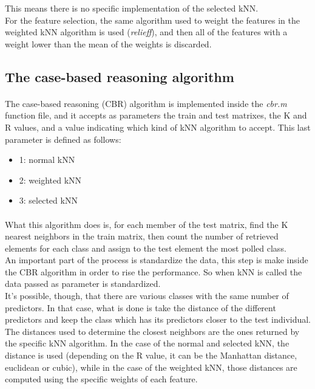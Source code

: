 \documentclass[12pt, a4paper]{article}
\begin{document}
This means there is no specific implementation of the selected kNN.\\

For the feature selection, the same algorithm used to weight the features in the weighted kNN algorithm is used (\emph{relieff}), and then all of the features with a weight lower than the mean of the weights is discarded.
\subsection{The case-based reasoning algorithm} %
\label{sub:the_case_based_reasoning_algorithm}
\paragraph{}The case-based reasoning (CBR) algorithm is implemented inside the \emph{cbr.m} function file, and it accepts as parameters the train and test matrixes, the K and R values, and a value indicating which kind of kNN algorithm to accept. This last parameter is defined as follows:
\begin{itemize}
	\item 1: normal kNN
	\item 2: weighted kNN
	\item 3: selected kNN
\end{itemize}
\paragraph{}What this algorithm does is, for each member of the test matrix, find the K nearest neighbors in the train matrix, then count the number of retrieved elements for each class and assign to the test element the most polled class.\\

An important part of the process is standardize the data, this step is make inside the CBR algorithm in order to rise the performance. So when kNN is called the data passed as parameter is standardized.\\

It's possible, though, that there are various classes with the same number of predictors. In that case, what is done is take the distance of the different predictors and keep the class which has its predictors closer to the test individual.\\

The distances used to determine the closest neighbors are the ones returned by the specific kNN algorithm. In the case of the normal and selected kNN, the distance is used (depending on the R value, it can be the Manhattan distance, euclidean or cubic), while in the case of the weighted kNN, those distances are computed using the specific weights of each feature.\\
\end{document}
